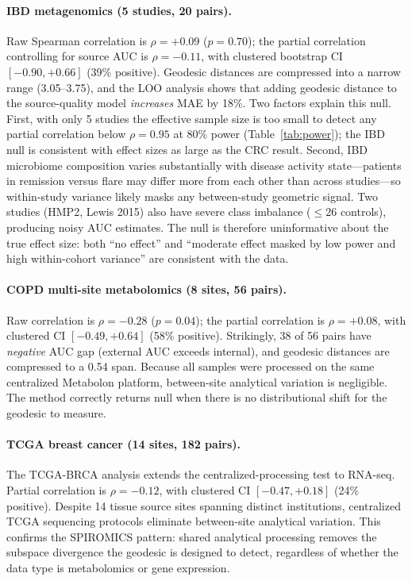 \documentclass[11pt]{article}
\begin{document}
\paragraph{IBD metagenomics (5 studies, 20 pairs).} Raw Spearman correlation is $\rho = +0.09$ ($p = 0.70$); the partial correlation controlling for source AUC is $\rho = -0.11$, with clustered bootstrap CI $[-0.90, +0.66]$ (39\% positive). Geodesic distances are compressed into a narrow range (3.05--3.75), and the LOO analysis shows that adding geodesic distance to the source-quality model \emph{increases} MAE by 18\%. Two factors explain this null. First, with only 5 studies the effective sample size is too small to detect any partial correlation below $\rho = 0.95$ at 80\% power (Table~\ref{tab:power}); the IBD null is consistent with effect sizes as large as the CRC result. Second, IBD microbiome composition varies substantially with disease activity state---patients in remission versus flare may differ more from each other than across studies---so within-study variance likely masks any between-study geometric signal. Two studies (HMP2, Lewis 2015) also have severe class imbalance ($\leq$26 controls), producing noisy AUC estimates. The null is therefore uninformative about the true effect size: both ``no effect'' and ``moderate effect masked by low power and high within-cohort variance'' are consistent with the data.

\paragraph{COPD multi-site metabolomics (8 sites, 56 pairs).} Raw correlation is $\rho = -0.28$ ($p = 0.04$); the partial correlation is $\rho = +0.08$, with clustered CI $[-0.49, +0.64]$ (58\% positive). Strikingly, 38 of 56 pairs have \emph{negative} AUC gap (external AUC exceeds internal), and geodesic distances are compressed to a 0.54 span. Because all samples were processed on the same centralized Metabolon platform, between-site analytical variation is negligible. The method correctly returns null when there is no distributional shift for the geodesic to measure.

\paragraph{TCGA breast cancer (14 sites, 182 pairs).} The TCGA-BRCA analysis extends the centralized-processing test to RNA-seq. Partial correlation is $\rho = -0.12$, with clustered CI $[-0.47, +0.18]$ (24\% positive). Despite 14 tissue source sites spanning distinct institutions, centralized TCGA sequencing protocols eliminate between-site analytical variation. This confirms the SPIROMICS pattern: shared analytical processing removes the subspace divergence the geodesic is designed to detect, regardless of whether the data type is metabolomics or gene expression.
\end{document}
